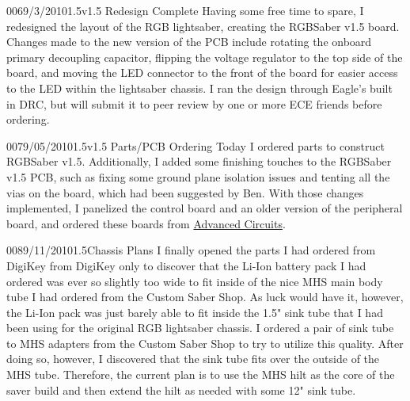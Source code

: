 \documentclass[12pt,letterpaper,onecolumn]{article}
\begin{document}
\begin{nbentry}{006}{9/3/2010}{1.5}{v1.5 Redesign Complete}
	Having some free time to spare, I redesigned the layout of the RGB lightsaber, creating the RGBSaber v1.5 board. Changes made to the new version of the PCB include rotating the onboard primary decoupling capacitor, flipping the voltage regulator to the top side of the board, and moving the LED connector to the front of the board for easier access to the LED within the lightsaber chassis. I ran the design through Eagle's built in DRC, but will submit it to peer review by one or more ECE friends before ordering.
\end{nbentry}

\begin{nbentry}{007}{9/05/2010}{1.5}{v1.5 Parts/PCB Ordering}
	Today I ordered parts to construct RGBSaber v1.5. Additionally, I added some finishing touches to the RGBSaber v1.5 PCB, such as fixing some ground plane isolation issues and tenting all the vias on the board, which had been suggested by Ben. With those changes implemented, I panelized the control board and an older version of the peripheral board, and ordered these boards from \href{http://www.4pcb.com}{Advanced Circuits}.
\end{nbentry}

\begin{nbentry}{008}{9/11/2010}{1.5}{Chassis Plans}
	I finally opened the parts I had ordered from DigiKey from DigiKey only to discover that the Li-Ion battery pack I had ordered was ever so slightly too wide to fit inside of the nice MHS main body tube I had ordered from the Custom Saber Shop. As luck would have it, however, the Li-Ion pack was just barely able to fit inside the 1.5" sink tube that I had been using for the original RGB lightsaber chassis. I ordered a pair of sink tube to MHS adapters from the Custom Saber Shop to try to utilize this quality. After doing so, however, I discovered that the sink tube fits over the outside of the MHS tube. Therefore, the current plan is to use the MHS hilt as the core of the saver build and then extend the hilt as needed with some 12" sink tube.
\end{nbentry}
\end{document}
